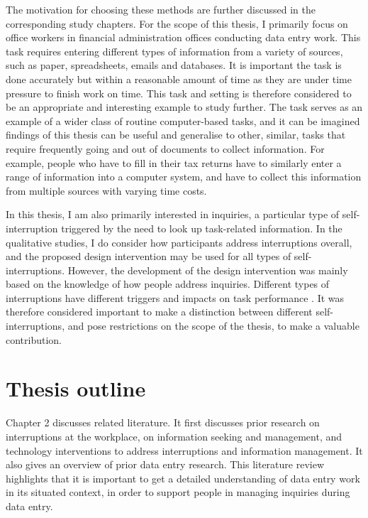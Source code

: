 The motivation for choosing these methods are further discussed in the corresponding study chapters. 
For the scope of this thesis, I primarily focus on office workers in financial administration offices conducting data entry work. This task requires entering different types of information from a variety of sources, such as paper, spreadsheets, emails and databases. It is important the task is done accurately but within a reasonable amount of time as they are under time pressure to finish work on time. This task and setting is therefore considered to be an appropriate and interesting example to study further. The task serves as an example of a wider class of routine computer-based tasks, and it can be imagined findings of this thesis can be useful and generalise to other, similar, tasks that require frequently going and out of documents to collect information. For example, people who have to fill in their tax returns have to similarly enter a range of information into a computer system, and have to collect this information from multiple sources with varying time costs.

In this thesis, I am also primarily interested in inquiries, a particular type of self-interruption triggered by the need to look up task-related information. 
In the qualitative studies, I do consider how participants address interruptions overall, and the proposed design intervention may be used for all types of self-interruptions. However, the development of the design intervention was mainly based on the knowledge of how people address inquiries. Different types of interruptions have different triggers and impacts on task performance \citep{Jin2009}. It was therefore considered important to make a distinction between different self-interruptions, and pose restrictions on the scope of the thesis, to make a valuable contribution.

\section{Thesis outline}
Chapter 2 discusses related literature. It first discusses prior research on interruptions at the workplace, on information seeking and management, and technology interventions to address interruptions and information management. It also gives an overview of prior data entry research. This literature review highlights that it is important to get a detailed understanding of data entry work in its situated context, in order to support people in managing inquiries during data entry. 

